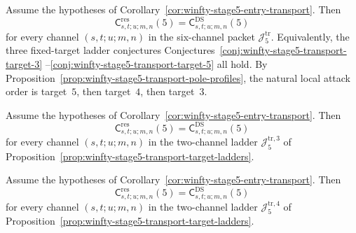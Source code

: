 \begin{conjecture}
\label{conj:winfty-stage5-transport-identities}
\ClaimStatusConjectured{}
Assume the hypotheses of
Corollary~\ref{cor:winfty-stage5-entry-transport}.  Then
\[
\mathsf{C}^{\mathrm{res}}_{s,t;u;m,n}(5)
=
\mathsf{C}^{\mathrm{DS}}_{s,t;u;m,n}(5)
\]
for every channel $(s,t;u;m,n)$ in the six-channel packet
$\mathcal{J}_5^{\mathrm{tr}}$.  Equivalently, the three fixed-target
ladder conjectures
Conjectures~\ref{conj:winfty-stage5-transport-target-3}
--\ref{conj:winfty-stage5-transport-target-5}
all hold.  By
Proposition~\ref{prop:winfty-stage5-transport-pole-profiles}, the
natural local attack order is target~$5$, then target~$4$, then
target~$3$.
\end{conjecture}

\begin{conjecture}
\label{conj:winfty-stage5-transport-target-3}
\ClaimStatusConjectured{}
Assume the hypotheses of
Corollary~\ref{cor:winfty-stage5-entry-transport}.  Then
\[
\mathsf{C}^{\mathrm{res}}_{s,t;u;m,n}(5)
=
\mathsf{C}^{\mathrm{DS}}_{s,t;u;m,n}(5)
\]
for every channel $(s,t;u;m,n)$ in the two-channel ladder
$\mathcal{J}_5^{\mathrm{tr},3}$ of
Proposition~\ref{prop:winfty-stage5-transport-target-ladders}.
\end{conjecture}

\begin{conjecture}
\label{conj:winfty-stage5-transport-target-4}
\ClaimStatusConjectured{}
Assume the hypotheses of
Corollary~\ref{cor:winfty-stage5-entry-transport}.  Then
\[
\mathsf{C}^{\mathrm{res}}_{s,t;u;m,n}(5)
=
\mathsf{C}^{\mathrm{DS}}_{s,t;u;m,n}(5)
\]
for every channel $(s,t;u;m,n)$ in the two-channel ladder
$\mathcal{J}_5^{\mathrm{tr},4}$ of
Proposition~\ref{prop:winfty-stage5-transport-target-ladders}.
\end{conjecture}

